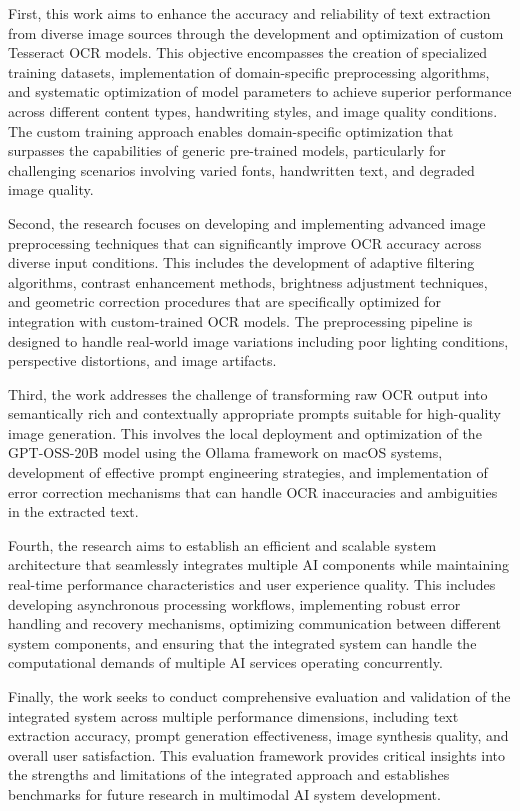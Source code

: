 First, this work aims to enhance the accuracy and reliability of text extraction from diverse image sources through the development and optimization of custom Tesseract OCR models. This objective encompasses the creation of specialized training datasets, implementation of domain-specific preprocessing algorithms, and systematic optimization of model parameters to achieve superior performance across different content types, handwriting styles, and image quality conditions. The custom training approach enables domain-specific optimization that surpasses the capabilities of generic pre-trained models, particularly for challenging scenarios involving varied fonts, handwritten text, and degraded image quality.

Second, the research focuses on developing and implementing advanced image preprocessing techniques that can significantly improve OCR accuracy across diverse input conditions. This includes the development of adaptive filtering algorithms, contrast enhancement methods, brightness adjustment techniques, and geometric correction procedures that are specifically optimized for integration with custom-trained OCR models. The preprocessing pipeline is designed to handle real-world image variations including poor lighting conditions, perspective distortions, and image artifacts.

Third, the work addresses the challenge of transforming raw OCR output into semantically rich and contextually appropriate prompts suitable for high-quality image generation. This involves the local deployment and optimization of the GPT-OSS-20B model using the Ollama framework on macOS systems, development of effective prompt engineering strategies, and implementation of error correction mechanisms that can handle OCR inaccuracies and ambiguities in the extracted text.

Fourth, the research aims to establish an efficient and scalable system architecture that seamlessly integrates multiple AI components while maintaining real-time performance characteristics and user experience quality. This includes developing asynchronous processing workflows, implementing robust error handling and recovery mechanisms, optimizing communication between different system components, and ensuring that the integrated system can handle the computational demands of multiple AI services operating concurrently.

Finally, the work seeks to conduct comprehensive evaluation and validation of the integrated system across multiple performance dimensions, including text extraction accuracy, prompt generation effectiveness, image synthesis quality, and overall user satisfaction. This evaluation framework provides critical insights into the strengths and limitations of the integrated approach and establishes benchmarks for future research in multimodal AI system development.


